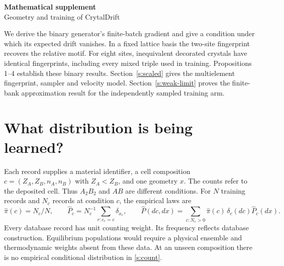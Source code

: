 \begingroup
\setcounter{section}{0}
\setcounter{equation}{0}
\renewcommand{\thesection}{S\arabic{section}}
\renewcommand{\theequation}{S\arabic{equation}}
\ifdefined\theHsection{}\fi
\ifdefined\theHequation{}\fi
\newcommand{\rd}{\mathbb R}
\newcommand{\tor}{\mathbb T}
\newcommand{\zz}{\mathbb Z}
\newcommand{\ii}{\mathrm i}
\providecommand{\sg}{\operatorname{sg}}
\newcommand{\E}{\mathbb E}
\newcommand{\norm}[1]{\left\lVert #1\right\rVert}
\newcommand{\proofend}{\hfill$\square$}
\newcommand{\claim}[2]{\par\medskip\noindent\textbf{#1.} \emph{#2}\par}
\newcommand{\work}[1]{\texttt{\detokenize{#1}}}

\begin{center}
{\Large\bfseries Mathematical supplement}\\[5pt]
{\large Geometry and training of CrytalDrift}
\end{center}

\noindent We derive the binary generator's finite-batch gradient and give a condition under which its expected drift vanishes. In a fixed lattice basis the two-site fingerprint recovers the relative motif. For eight sites, inequivalent decorated crystals have identical fingerprints, including every mixed triple used in training. Propositions 1--4 establish these binary results. Section~\ref{s:scaled} gives the multielement fingerprint, sampler and velocity model. Section~\ref{s:weak-limit} proves the finite-bank approximation result for the independently sampled training arm.

\section{What distribution is being learned?}
Each record supplies a material identifier, a cell composition
$c=(Z_A,Z_B,n_A,n_B)$ with $Z_A<Z_B$, and one geometry $x$. The counts refer to the deposited cell. Thus $A_2B_2$ and $AB$ are different conditions. For $N$ training records and $N_c$ records at condition $c$, the empirical laws are
\begin{equation}
 \widehat\pi(c)=N_c/N,\qquad
 \widehat P_c=N_c^{-1}\sum_{r:c_r=c}\delta_{x_r},\qquad
 \widehat P(dc,dx)=\sum_{c:N_c>0}\widehat\pi(c)\,\delta_c(dc)\widehat P_c(dx).
 \label{s:count}
\end{equation}
Every database record has unit counting weight. Its frequency reflects database construction. Equilibrium populations would require a physical ensemble and thermodynamic weights absent from these data. At an unseen composition there is no empirical conditional distribution in \eqref{s:count}.


